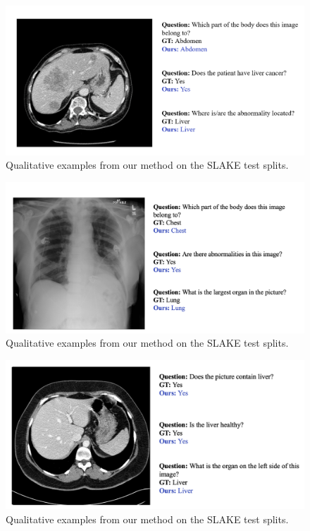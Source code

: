 \begin{figure}[t]
\begin{center}
\includegraphics[width=1.0\linewidth]{Chapter_4/chap4_result1.png}
\end{center}
   \caption{Qualitative examples from our method on the SLAKE test splits.
}
\label{fig:qualitative1}
\end{figure}


\begin{figure}[t]
\begin{center}
\includegraphics[width=1.0\linewidth]{Chapter_4/chap4_result3.png}
\end{center}
   \caption{Qualitative examples from our method on the SLAKE test splits.
}
\label{fig:qualitative3}
\end{figure}


\begin{figure}[t]
\begin{center}
\includegraphics[width=1.0\linewidth]{Chapter_4/chap4_result4.png}
\end{center}
   \caption{Qualitative examples from our method on the SLAKE test splits.
}
\label{fig:qualitative4}
\end{figure}


